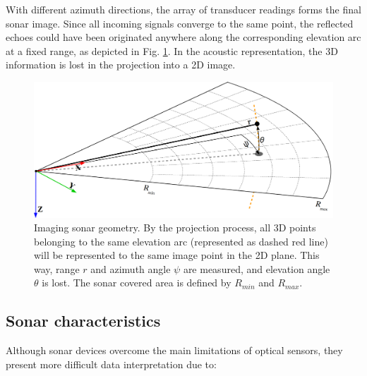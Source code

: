 \documentclass[final,5p,times]{elsarticle}
\begin{document}
With different azimuth directions, the array of transducer readings forms the
final sonar image. Since all incoming signals converge to the same point, the
reflected echoes could have been originated anywhere along the corresponding
elevation arc at a fixed range, as depicted in Fig. \ref{fig:sonar_geometry}.
In the acoustic representation, the 3D information is lost in the projection
into a 2D image.

\begin{figure}[t]
    \includegraphics[width=\columnwidth]{figs/sonar_geometry_2}
    \centering
    \captionsetup{justification=centering}
    \caption{Imaging sonar geometry. By the projection process, all 3D points
    belonging to the same elevation arc (represented as dashed red line) will
    be represented to the same image point in the 2D plane. This way,
    range $r$ and azimuth angle $\psi$ are measured, and elevation
    angle $\theta$ is lost. The sonar covered area is defined by $R_{min}$
    and $R_{max}$.}
    \label{fig:sonar_geometry}
\end{figure}


\subsection{Sonar characteristics}
\label{sonar:characteristics}

Although sonar devices overcome the main limitations of optical sensors, they
present more difficult data interpretation due to:
\end{document}
